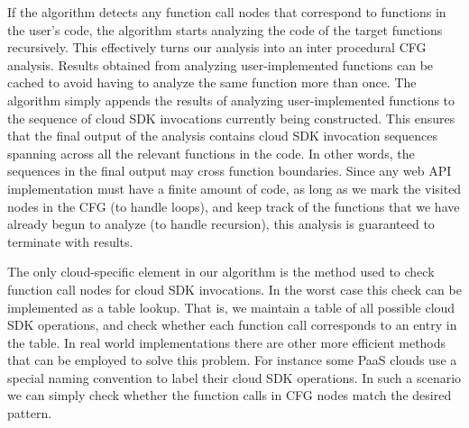 
If the algorithm detects any function call nodes that correspond to functions in the user's code, the algorithm
starts analyzing the code of the target functions recursively. This effectively turns our analysis into an inter procedural
CFG analysis. Results obtained from analyzing user-implemented functions can be cached to avoid
having to analyze the same function more than once. The algorithm simply appends the results of
analyzing user-implemented functions to the sequence of cloud SDK invocations currently being constructed. 
This ensures that the final output of the
analysis contains cloud SDK invocation sequences spanning across all the relevant functions in the code. 
In other words, the sequences in the final output may cross function boundaries.
Since any web API implementation must have a finite amount of code, as long as
we mark the visited nodes in the CFG (to handle loops), and keep track of the functions that we have 
already begun to analyze (to handle recursion), this analysis is guaranteed to terminate with results.

 
The only cloud-specific element in our algorithm is the method used to check function call nodes for cloud SDK invocations.
 In the worst case this check can be implemented as a table lookup. That is, we maintain a table of all possible cloud
 SDK operations, and check whether each function call
 corresponds to an entry in the table. In real world implementations there are other more efficient methods that
 can be employed to solve this problem. For instance some PaaS clouds use a special naming convention to label
 their cloud SDK operations. 
 In such a scenario we can simply check whether the function calls in CFG nodes match the
 desired pattern. 
 
